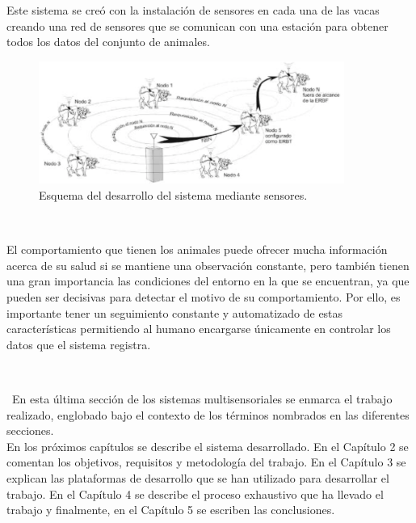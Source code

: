 \begin{itemize}
Este sistema se creó con la instalación de sensores en cada una de las vacas creando una red de sensores que se comunican con una estación para obtener todos los datos del conjunto de animales.
\begin{figure} [h!]
  \begin{center}
    \includegraphics[width=10cm]{figs/saopaulo}
  \end{center}
  \caption{Esquema del desarrollo del sistema mediante sensores.}
  \label{fig:usao}
\end{figure}
\end{itemize}\

El comportamiento que tienen los animales puede ofrecer mucha información acerca de su salud si se mantiene una observación constante, pero también tienen una gran importancia las condiciones del entorno en la que se encuentran, ya que pueden ser decisivas para detectar el motivo de su comportamiento. Por ello, es importante tener un seguimiento constante y automatizado de estas características permitiendo al humano encargarse únicamente en controlar los datos que el sistema registra.
\

\

\
En esta última sección de los sistemas multisensoriales se enmarca el trabajo realizado, englobado bajo el contexto de los términos nombrados en las diferentes secciones.\\

En los próximos capítulos se describe el sistema desarrollado. En el Capítulo 2 se comentan los objetivos, requisitos y metodología del trabajo. En el Capítulo 3 se explican las plataformas de desarrollo que se han utilizado para desarrollar el trabajo. En el Capítulo 4 se describe el proceso exhaustivo que ha llevado el trabajo y finalmente, en el Capítulo 5 se escriben las conclusiones.

